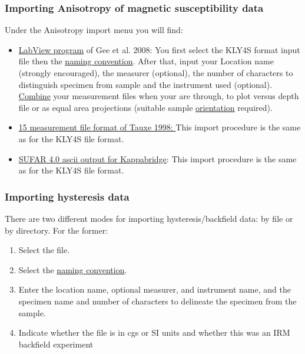 \documentclass[11pt]{book}
\begin{document}
{\subsubsection{Importing Anisotropy of magnetic susceptibility data}

Under the Anisotropy import menu you will find:  


\begin{itemize}
\item \href{#KLY4S_magic.py}{LabView program} of Gee et al. 2008: \nocite{gee08}   
You first select the KLY4S format input file then the  \href{#naming_schemes}{naming convention}.  After that, input your Location name (strongly encouraged), the measurer (optional), the number of characters to distinguish specimen from sample and the instrument used (optional).    \href{#Combining_measurement_files}{Combine} your measurement files when your are through, to plot versus depth  file or as equal area projections (suitable sample \href{#ImportOrient}{orientation} required).  
\item \href{#k15\_magic.py}{15 measurement file format of Tauxe 1998: \nocite{tauxe98}} This import procedure is the same as for the KLY4S file format.
\item \href{#SUFAR4-asc\_magic.py}{SUFAR 4.0 ascii output for Kappabridge}: This import procedure is the same as for the KLY4S file format.

\end{itemize}

\subsubsection{Importing hysteresis data}


There are two different modes for importing hysteresis/backfield data:  by file or by directory.  For the former:
\begin{enumerate}
\item Select the file.
\item Select the  \href{#naming_schemes}{naming convention}.
\item Enter the location name, optional measurer, and instrument name, and the specimen name and number of characters to delineate the specimen from the sample.
\item Indicate whether the file is in cgs or SI units and whether this was an IRM backfield experiment
\end{enumerate}

}
\end{document}
